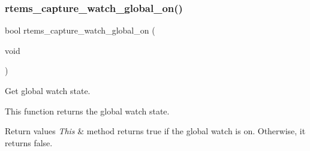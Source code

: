 \subsubsection{\texorpdfstring{rtems\_capture\_watch\_global\_on()}{rtems\_capture\_watch\_global\_on()}}
{\footnotesize\ttfamily bool rtems\+\_\+capture\+\_\+watch\+\_\+global\+\_\+on (\begin{DoxyParamCaption}\item[{void}]{ }\end{DoxyParamCaption})}



Get global watch state. 

This function returns the global watch state.


\begin{DoxyRetVals}{Return values}
{\em This} & method returns true if the global watch is on. Otherwise, it returns false. \\
\hline
\end{DoxyRetVals}
